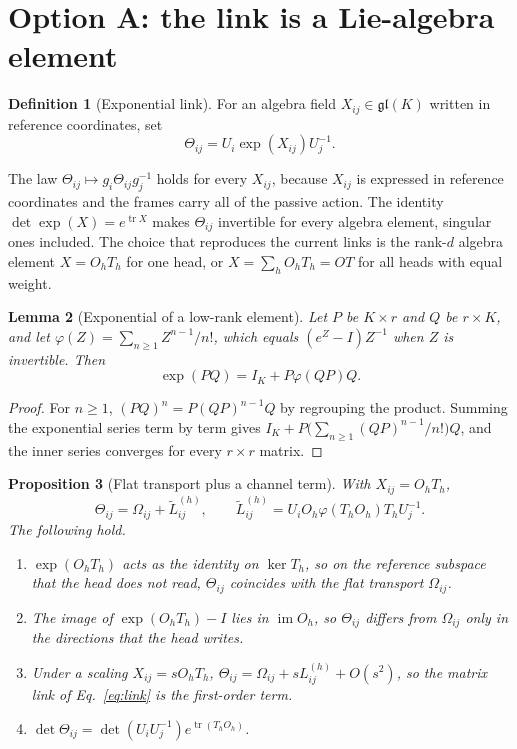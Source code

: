 \documentclass[11pt]{article}
\newtheorem{proposition}{Proposition}
\newtheorem{lemma}[proposition]{Lemma}
\theoremstyle{definition}
\newtheorem{definition}[proposition]{Definition}
\theoremstyle{remark}
\newcommand{\gl}{\mathfrak{gl}}
\newcommand{\tr}{\operatorname{tr}}
\newcommand{\im}{\operatorname{im}}
\begin{document}
\section{Option A: the link is a Lie-algebra element}
\label{sec:exp}

\begin{definition}[Exponential link]
For an algebra field $X_{ij}\in\gl(K)$ written in reference coordinates, set
\begin{equation}
\Theta_{ij}=U_i\exp(X_{ij})U_j^{-1}.
\label{eq:exp_link}
\end{equation}
\end{definition}

The law $\Theta_{ij}\mapsto g_i\Theta_{ij}g_j^{-1}$ holds for every $X_{ij}$, because $X_{ij}$ is expressed in reference coordinates and the frames carry all of the passive action. The identity $\det\exp(X)=e^{\tr X}$ makes $\Theta_{ij}$ invertible for every algebra element, singular ones included. The choice that reproduces the current links is the rank-$d$ algebra element $X=O_hT_h$ for one head, or $X=\sum_hO_hT_h=OT$ for all heads with equal weight.

\begin{lemma}[Exponential of a low-rank element]
\label{lem:lowrank_exp}
Let $P$ be $K\times r$ and $Q$ be $r\times K$, and let $\varphi(Z)=\sum_{n\ge1}Z^{n-1}/n!$, which equals $(e^Z-I)Z^{-1}$ when $Z$ is invertible. Then
\begin{equation}
\exp(PQ)=I_K+P\varphi(QP)Q.
\label{eq:lowrank_exp}
\end{equation}
\end{lemma}

\begin{proof}
For $n\ge1$, $(PQ)^n=P(QP)^{n-1}Q$ by regrouping the product. Summing the exponential series term by term gives $I_K+P\big(\sum_{n\ge1}(QP)^{n-1}/n!\big)Q$, and the inner series converges for every $r\times r$ matrix.
\end{proof}

\begin{proposition}[Flat transport plus a channel term]
\label{prop:split}
With $X_{ij}=O_hT_h$,
\begin{equation}
\Theta_{ij}=\Omega_{ij}+\widetilde L_{ij}^{(h)},\qquad
\widetilde L_{ij}^{(h)}=U_iO_h\varphi(T_hO_h)T_hU_j^{-1}.
\label{eq:split}
\end{equation}
The following hold.
\begin{enumerate}
\item $\exp(O_hT_h)$ acts as the identity on $\ker T_h$, so on the reference subspace that the head does not read, $\Theta_{ij}$ coincides with the flat transport $\Omega_{ij}$.
\item The image of $\exp(O_hT_h)-I$ lies in $\im O_h$, so $\Theta_{ij}$ differs from $\Omega_{ij}$ only in the directions that the head writes.
\item Under a scaling $X_{ij}=sO_hT_h$, $\Theta_{ij}=\Omega_{ij}+sL_{ij}^{(h)}+O(s^2)$, so the matrix link of Eq.~\eqref{eq:link} is the first-order term.
\item $\det\Theta_{ij}=\det(U_iU_j^{-1})e^{\tr(T_hO_h)}$.
\end{enumerate}
\end{proposition}
\end{document}
